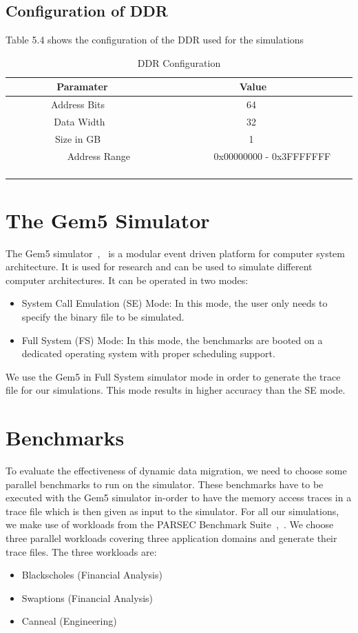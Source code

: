 \documentclass{listhesis}
\begin{document}
\subsection{Configuration of DDR}
Table 5.4 shows the configuration of the DDR used for the simulations
\begin{table}[h!]
\begin{center}
 \begin{tabular}{|| c | c ||} 
 \hline
 \ \textbf{Paramater} & \textbf{Value}  \\ [0.5 ex] 
 \hline\hline
 \ \ \ \ \ \ \ \ Address Bits \ \ \ \ \ \ \ \ & \ \ \ \ \ \ \ \ 64 \ \ \ \ \ \ \ \ \\ 
 \hline
 \ \ \ \ \ \ \ \ Data Width\ \ \ \ \ \ \ \ & \ \ \ \ \ \ \ \ 32 \ \ \ \ \ \ \ \ \\
 \hline
 \ \ \ \ \ \ \ \ Size in GB \ \ \ \ \ \ \ \ & \ \ \ \ \ \ \ \ 1 \ \ \ \ \ \ \ \  \\
 \hline
 \ \ \ \ \ \ \ \ Address Range \ \ \ \ \ \ \ \ & \ \ \ \ \ \ \ \ 0x00000000 - 0x3FFFFFFF \ \ \ \ \ \ \ \  \\
  \hline
\end{tabular}
 \caption{DDR Configuration}
 \label{table:DDR}
\end{center}
\end{table}
\section{The Gem5 Simulator}
The Gem5 simulator~\cite{gem5},~\cite{akshay} is a modular event driven platform for computer system architecture. It is used for research and can be used to simulate different computer architectures. It can be operated in two modes:
\begin{itemize}
\item System Call Emulation (SE) Mode: In this mode, the user only needs to specify the binary file to be simulated.
\item Full System (FS) Mode: In this mode, the benchmarks are booted on a dedicated operating system with proper scheduling support. 
\end{itemize}
 We use the Gem5 in Full System simulator mode in order to generate the trace file for our simulations. This mode results in higher accuracy than the SE mode.
\section{Benchmarks}
To evaluate the effectiveness of dynamic data migration, we need to choose some parallel benchmarks to run on the simulator. These benchmarks have to be executed with the Gem5 simulator in-order to have the memory access traces in a trace file which is then given as input to the simulator. For all our simulations, we make use of workloads from the PARSEC Benchmark Suite~\cite{lispaper},~\cite{trace}. We choose three parallel workloads covering three application domains and generate their trace files. The three workloads are: 
\begin{itemize}
\item Blackscholes (Financial Analysis)
\item Swaptions (Financial Analysis)
\item Canneal (Engineering)
\end{itemize}
\end{document}

